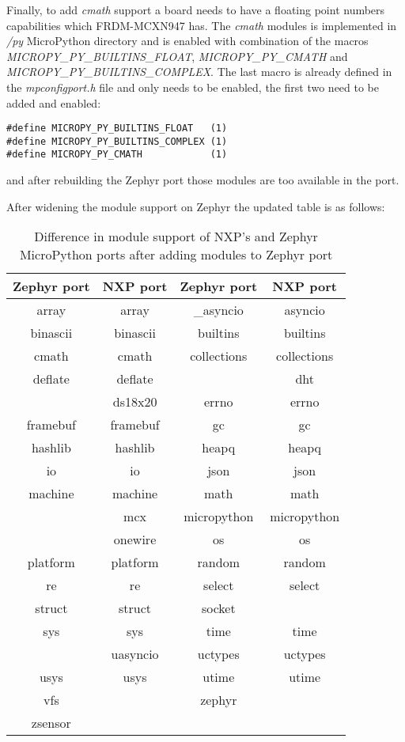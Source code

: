 \documentclass[twoside, 12pt]{article}
\begin{document}
Finally, to add \textit{cmath} support a board needs to have a floating point numbers 
capabilities \cite{mpy_cmath} which FRDM-MCXN947 has. The \textit{cmath} modules is 
implemented in \textit{/py} MicroPython directory and is enabled with combination of the 
macros \textit{MICROPY\_PY\_BUILTINS\_FLOAT}, \textit{MICROPY\_PY\_CMATH} and 
\textit{MICROPY\_PY\_BUILTINS\_COMPLEX}. The last macro is already defined in the 
\textit{mpconfigport.h} file and only needs to be enabled, the first two need to be added and 
enabled:
\begin{lstlisting}[caption={Extending Zephyr port modules support, Part 3},breaklines=true]
#define MICROPY_PY_BUILTINS_FLOAT   (1)
#define MICROPY_PY_BUILTINS_COMPLEX (1)
#define MICROPY_PY_CMATH            (1)
\end{lstlisting}
and after rebuilding the Zephyr port those modules are too available in the port.

After widening the module support on Zephyr the updated table is as follows:

\begin{table}[H]
\centering
\caption{Difference in module support of NXP's and Zephyr MicroPython ports after adding modules to Zephyr port}
\label{tab:micropython-modules-updated}
\renewcommand{\arraystretch}{1.2}
\begin{tabular}{|c|c||c|c|} \hline
\textbf{Zephyr port} & \textbf{NXP port} & \textbf{Zephyr port} & \textbf{NXP port} \\ \hline
array & array & \_asyncio & asyncio \\ \hline
binascii & binascii & builtins & builtins \\ \hline
cmath & cmath & collections & collections \\ \hline
deflate & deflate & & dht \\ \hline
& ds18x20 & errno & errno \\ \hline
framebuf & framebuf & gc & gc \\ \hline
hashlib & hashlib & heapq & heapq \\ \hline
io & io & json & json \\ \hline
machine & machine & math & math \\ \hline
& mcx & micropython & micropython \\ \hline
& onewire & os & os \\ \hline
platform & platform & random & random \\ \hline
re & re & select & select \\ \hline
struct & struct & socket & \\ \hline
sys & sys & time & time \\ \hline
& uasyncio & uctypes & uctypes \\ \hline
usys & usys & utime & utime \\ \hline
vfs & & zephyr & \\ \hline
zsensor & & & \\ \hline
\end{tabular}
\end{table}
\end{document}
